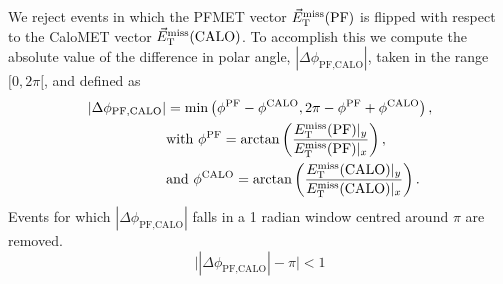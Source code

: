 We reject events in which the PFMET vector ${\vec E}_{\mathrm{T}}^{\text{miss}}(\textrm{PF})$ is flipped with
respect to the CaloMET vector ${\vec E}_{\mathrm{T}}^{\text{miss}}(\textrm{CALO})$. 
To accomplish this we compute the absolute value of the difference in polar angle,
 $|\Delta\phi_{\textrm{PF,CALO}}|$, taken in the range $[0,2\pi[$, and defined as
\begin{align}
|\Delta\phi_{\textrm{PF,CALO}}| &= \min \left ( \phi^{\textrm{PF}} - \phi^{\textrm{CALO}},   2\pi -
\phi^{\textrm{PF}} + \phi^{\textrm{CALO}} \right) ,\\
&\textrm{with } \phi^{\textrm{PF}} = \textrm{arctan} \left( \frac{E_{\mathrm{T}}^{\text{miss}}(\textrm{PF})|_y}
{E_{\mathrm{T}}^{\text{miss}}(\textrm{PF})|_x} \right) , \\
&\textrm{and } \phi^{\textrm{CALO}} = \textrm{arctan}\left( \frac{E_{\mathrm{T}}^{\text{miss}}(\textrm{CALO})|_y}
{E_{\mathrm{T}}^{\text{miss}}(\textrm{CALO})|_x} \right) .
\end{align}
Events for which $|\Delta\phi_{\textrm{PF,CALO}}|$ falls in a 1 radian window centred around $\pi$
are removed. 
\begin{equation}
\bigl| |\Delta\phi_{\textrm{PF,CALO}}| - \pi \bigr| < 1
\label{eqn:dphicut}
\end{equation}